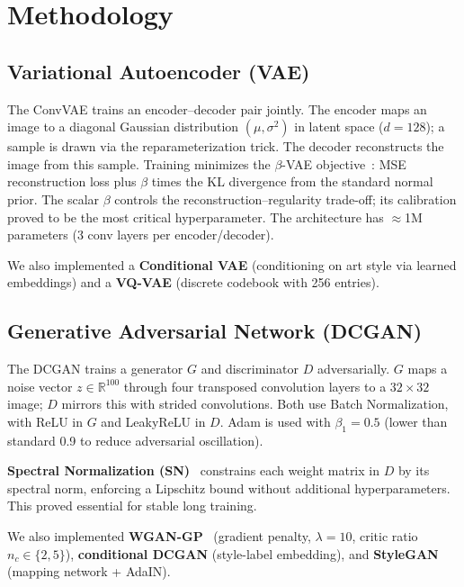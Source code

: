 \documentclass[runningheads]{llncs}
\begin{document}
\section{Methodology}\label{sec:methodology}

\subsection{Variational Autoencoder (VAE)}

The ConvVAE trains an encoder--decoder pair jointly. The encoder maps an image to a diagonal Gaussian distribution $(\mu, \sigma^2)$ in latent space ($d=128$); a sample is drawn via the reparameterization trick. The decoder reconstructs the image from this sample. Training minimizes the $\beta$-VAE objective~\cite{higgins2017}: MSE reconstruction loss plus $\beta$ times the KL divergence from the standard normal prior. The scalar $\beta$ controls the reconstruction--regularity trade-off; its calibration proved to be the most critical hyperparameter. The architecture has $\approx$1M parameters (3 conv layers per encoder/decoder).

We also implemented a \textbf{Conditional VAE} (conditioning on art style via learned embeddings) and a \textbf{VQ-VAE} (discrete codebook with 256 entries).

\subsection{Generative Adversarial Network (DCGAN)}

The DCGAN trains a generator $G$ and discriminator $D$ adversarially. $G$ maps a noise vector $z \in \mathbb{R}^{100}$ through four transposed convolution layers to a $32\times 32$ image; $D$ mirrors this with strided convolutions. Both use Batch Normalization, with ReLU in $G$ and LeakyReLU in $D$. Adam is used with $\beta_1=0.5$ (lower than standard 0.9 to reduce adversarial oscillation).

\textbf{Spectral Normalization (SN)}~\cite{miyato2018} constrains each weight matrix in $D$ by its spectral norm, enforcing a Lipschitz bound without additional hyperparameters. This proved essential for stable long training.

We also implemented \textbf{WGAN-GP}~\cite{gulrajani2017} (gradient penalty, $\lambda=10$, critic ratio $n_c \in \{2, 5\}$), \textbf{conditional DCGAN} (style-label embedding), and \textbf{StyleGAN}~\cite{karras2018} (mapping network + AdaIN).
\end{document}
